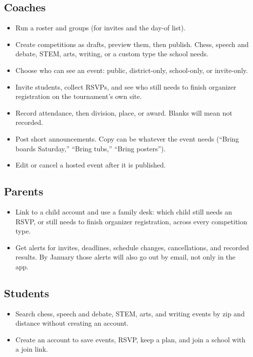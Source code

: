 \documentclass[11pt]{article}
\begin{document}
\subsection*{Coaches}
\begin{itemize}
  \item Run a roster and groups (for invites and the day-of list).
  \item Create competitions as drafts, preview them, then publish. Chess, speech and debate, STEM, arts, writing, or a custom type the school needs.
  \item Choose who can see an event: public, district-only, school-only, or invite-only.
  \item Invite students, collect RSVPs, and see who still needs to finish organizer registration on the tournament's own site.
  \item Record attendance, then division, place, or award. Blanks will mean not recorded.
  \item Post short announcements. Copy can be whatever the event needs (``Bring boards Saturday,'' ``Bring tubs,'' ``Bring posters'').
  \item Edit or cancel a hosted event after it is published.
\end{itemize}

\subsection*{Parents}
\begin{itemize}
  \item Link to a child account and use a family desk: which child still needs an RSVP, or still needs to finish organizer registration, across every competition type.
  \item Get alerts for invites, deadlines, schedule changes, cancellations, and recorded results. By January those alerts will also go out by email, not only in the app.
\end{itemize}

\subsection*{Students}
\begin{itemize}
  \item Search chess, speech and debate, STEM, arts, and writing events by zip and distance without creating an account.
  \item Create an account to save events, RSVP, keep a plan, and join a school with a join link.
\end{itemize}
\end{document}
